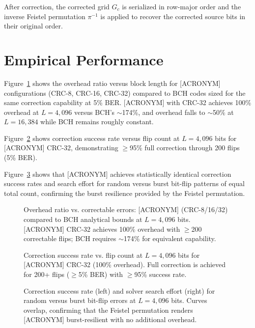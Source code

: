After correction, the corrected grid $G_c$ is serialized in row-major order and the inverse Feistel permutation $\pi^{-1}$ is applied to recover the corrected source bits in their original order.

\section{Empirical Performance}

Figure~\ref{fig:overhead} shows the overhead ratio versus block length for [ACRONYM] configurations (CRC-8, CRC-16, CRC-32) compared to BCH codes sized for the same correction capability at 5\% BER. [ACRONYM] with CRC-32 achieves 100\% overhead at $L=4{,}096$ versus BCH's $\sim$174\%, and overhead falls to $\sim$50\% at $L=16{,}384$ while BCH remains roughly constant.

Figure~\ref{fig:success} shows correction success rate versus flip count at $L=4{,}096$ bits for [ACRONYM] CRC-32, demonstrating $\geq$95\% full correction through 200 flips (5\% BER).

Figure~\ref{fig:burst} shows that [ACRONYM] achieves statistically identical correction success rates and search effort for random versus burst bit-flip patterns of equal total count, confirming the burst resilience provided by the Feistel permutation.

\begin{figure}[h]
    \centering
    \caption{Overhead ratio vs. correctable errors: [ACRONYM] (CRC-8/16/32) compared to BCH analytical bounds at $L=4{,}096$ bits. [ACRONYM] CRC-32 achieves 100\% overhead with $\geq$200 correctable flips; BCH requires $\sim$174\% for equivalent capability.}
    \label{fig:overhead}
\end{figure}

\begin{figure}[h]
    \centering
    \caption{Correction success rate vs. flip count at $L=4{,}096$ bits for [ACRONYM] CRC-32 (100\% overhead). Full correction is achieved for 200+ flips ($\geq$5\% BER) with $\geq$95\% success rate.}
    \label{fig:success}
\end{figure}

\begin{figure}[h]
    \centering
    \caption{Correction success rate (left) and solver search effort (right) for random versus burst bit-flip errors at $L=4{,}096$ bits. Curves overlap, confirming that the Feistel permutation renders [ACRONYM] burst-resilient with no additional overhead.}
    \label{fig:burst}
\end{figure}

